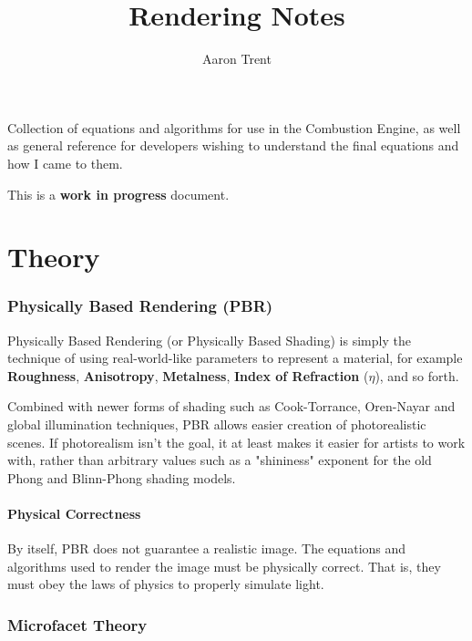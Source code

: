 \documentclass[12pt,letterpaper]{article}
\author{Aaron Trent}
\title{Rendering Notes}
\begin{document}
\maketitle

\begin{center}
\setlength{\parskip}{0.8em}

Collection of equations and algorithms for use in the Combustion Engine, 
as well as general reference for developers wishing to understand the final equations and how I came to them.

{\large This is a \textbf{work in progress} document.}
\end{center}

{\footnotesize \tableofcontents}

\setlength{\parindent}{4em}
\setlength{\parskip}{0.8em}

\newpage

\part{Theory}

\section{Physically Based Rendering (PBR)}

Physically Based Rendering (or Physically Based Shading) is simply the technique of using real-world-like parameters to represent
a material, for example \textbf{Roughness}, \textbf{Anisotropy}, \textbf{Metalness}, \textbf{Index of Refraction} ($\eta$), and so forth.

Combined with newer forms of shading such as Cook-Torrance, Oren-Nayar and global illumination techniques, PBR allows easier 
creation of photorealistic scenes. If photorealism isn't the goal, it at least makes it easier for artists to work with, rather 
than arbitrary values such as a "shininess" exponent for the old Phong and Blinn-Phong shading models.

\subsection{Physical Correctness}

By itself, PBR does not guarantee a realistic image. The equations and algorithms used to render the image must be physically correct.
That is, they must obey the laws of physics to properly simulate light.

\section{Microfacet Theory}
\end{document}
